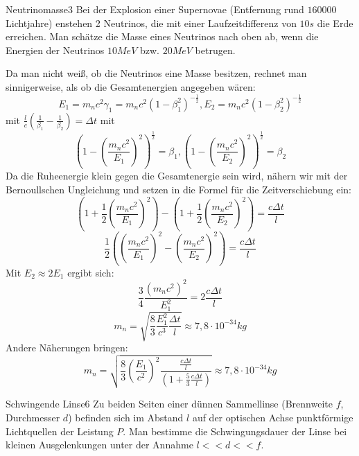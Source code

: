 


\begin{problem}{Neutrinomasse}{3}
Bei der Explosion einer Supernovae (Entfernung rund $160000$ Lichtjahre) enstehen 2 Neutrinos, die mit einer Laufzeitdifferenz von $10\unit{s}$ die Erde erreichen. Man schätze die Masse eines Neutrinos nach oben ab, wenn die Energien der Neutrinos $10\unit{MeV}$ bzw. $20\unit{MeV}$ betrugen.
\begin{solution}
Da man nicht weiß, ob die Neutrinos eine Masse besitzen, rechnet man sinnigerweise, als ob die Gesamtenergien angegeben wären:
$$E_1=m_nc^2\gamma_1=m_nc^2\left(1-\beta_1^2\right)^{-\frac 12}, E_2= m_nc^2\left(1-\beta_2^2\right)^{-\frac 12}$$
mit $\frac lc\left(\frac 1{\beta_1}-\frac 1{\beta_2}\right)=\Delta t$
mit 
$$\left(1-\left(\frac{m_nc^2}{E_1}\right)^2\right)^{\frac 12}=\beta_1, \left(1-\left(\frac{m_nc^2}{E_2}\right)^2\right)^{\frac 12}=\beta_2$$
Da die Ruheenergie klein gegen die Gesamtenergie sein wird, nähern wir mit der Bernoullschen Ungleichung und setzen in die Formel für die Zeitverschiebung ein:
$$\left(1+\frac 12\left(\frac{m_nc^2}{E_1}\right)^2\right)-\left(1+\frac 12\left(\frac{m_nc^2}{E_2}\right)^2\right)=\frac{c\Delta t}{l}$$
$$\frac 12\left(\left(\frac{m_nc^2}{E_1}\right)^2-\left(\frac{m_nc^2}{E_2}\right)^2\right)=\frac{c\Delta t}{l}$$
Mit $E_2\approx 2E_1$ ergibt sich:
$$\frac 34\frac{(m_nc^2)^2}{E_1^2}=2\frac{c\Delta t}l$$
$$m_n=\sqrt{\frac 83 \frac{E_1^2}{c^3}\frac{\Delta t}{l} }\approx 7,8\cdot 10^{-34}\unit{kg}$$
Andere Näherungen bringen:
$$m_n=\sqrt{\frac 83\left(\frac{E_1}{c^2}\right)^2\frac{\frac{c\Delta t}l}{\left( 1+\frac 53 \frac{c\Delta t}{l}\right)}}\approx 7,8\cdot 10^{-34}\unit{kg}$$
\end{solution}
\end{problem}

\begin{problem}{Schwingende Linse}{6}
Zu beiden Seiten einer dünnen Sammellinse (Brennweite $f$, Durchmesser $d$) befinden sich im Abstand $l$ auf der optischen Achse punktförmige Lichtquellen der Leistung $P$. Man bestimme die Schwingungsdauer der Linse bei kleinen Ausgelenkungen unter der Annahme $l<<d<<f$.
\end{problem}

